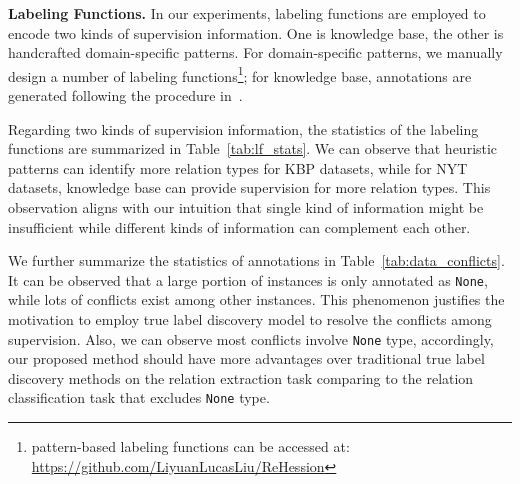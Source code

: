 \smallskip
\noindent
\textsf{\small\textbf{Labeling Functions. }} 
In our experiments, labeling functions are employed to encode two kinds of supervision information. 
One is knowledge base, the other is handcrafted domain-specific patterns. 
For domain-specific patterns, we manually design a number of labeling functions\footnote{pattern-based labeling functions can be accessed at: \url{https://github.com/LiyuanLucasLiu/ReHession}};
for knowledge base, annotations are generated following the procedure in~\cite{ren2016cotype,riedel2010modeling}.

Regarding two kinds of supervision information, the statistics of the labeling functions are summarized in Table~\ref{tab:lf_stats}.
We can observe that heuristic patterns can identify more relation types for KBP datasets, while for NYT datasets, knowledge base can provide supervision for more relation types.
This observation aligns with our intuition that single kind of information might be insufficient while different kinds of information can complement each other.

We further summarize the statistics of annotations in Table~\ref{tab:data_conflicts}.
It can be observed that a large portion of instances is only annotated as \texttt{None}, while lots of conflicts exist among other instances. This phenomenon justifies the motivation to employ true label discovery model to resolve the conflicts among supervision. Also, we can observe most conflicts involve \texttt{None} type, accordingly, our proposed method should have more advantages over traditional true label discovery methods on the relation extraction task comparing to the relation classification task that excludes \texttt{None} type.

